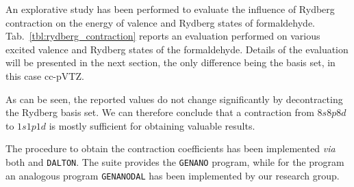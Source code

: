 An explorative study has been performed to evaluate the influence of Rydberg
contraction on the energy of valence and Rydberg states of formaldehyde.
Tab.~\ref{tbl:rydberg_contraction} reports an evaluation performed on
various excited valence and Rydberg states of the formaldehyde. Details of
the evaluation will be presented in the next section, the only difference
being the basis set, in this case cc-pVTZ\cite{jcp-90-1007-1989}.

As can be seen, the reported values do not change significantly by
decontracting the Rydberg basis set. We can therefore conclude that a
contraction from $8s8p8d$ to $1s1p1d$ is mostly sufficient for obtaining
valuable results.

The procedure to obtain the contraction coefficients has been implemented
\textit{via} both \molcas and \texttt{DALTON}. The \molcas suite provides the \texttt{GENANO}
program, while for the \dalton program an analogous program
\texttt{GENANODAL} has been implemented by our research group.




